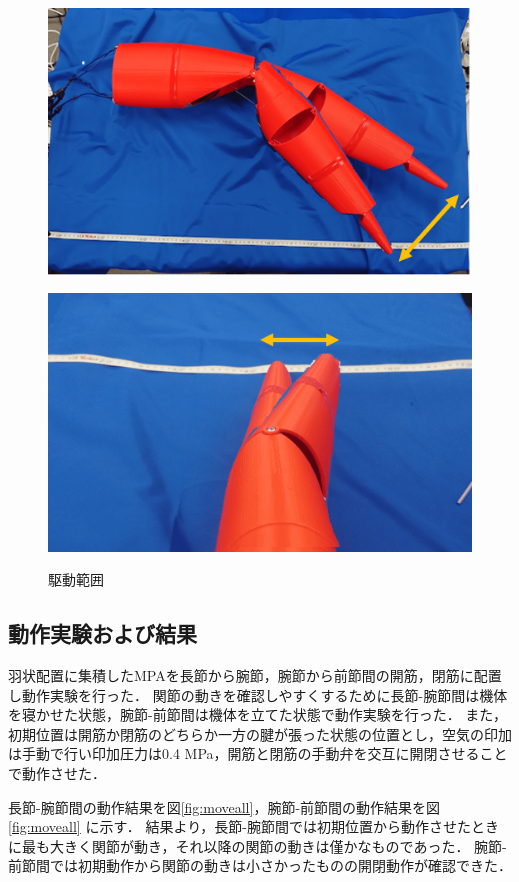 %
\begin{figure}[t]
  \begin{minipage}{0.5\hsize}
    \centering
    \includegraphics[scale=0.15]{image/kousatu2_1.png}
    \label{fig:kousatu2_1}
  \end{minipage}
  \begin{minipage}{0.5\hsize}
    \centering
    \includegraphics[scale=0.15]{image/kousatu2_2.png}
    \label{fig:kousatu2_2}
  \end{minipage}
  \caption{駆動範囲}
  \label{fig:kousatu2}
\end{figure}
\subsection{動作実験および結果}
羽状配置に集積したMPAを長節から腕節，腕節から前節間の開筋，閉筋に配置し動作実験を行った．
関節の動きを確認しやすくするために長節-腕節間は機体を寝かせた状態，腕節-前節間は機体を立てた状態で動作実験を行った．
また，初期位置は開筋か閉筋のどちらか一方の腱が張った状態の位置とし，空気の印加は手動で行い印加圧力は0.4 MPa，開筋と閉筋の手動弁を交互に開閉させることで動作させた．

長節-腕節間の動作結果を図\ref{fig:moveall}，腕節-前節間の動作結果を図\ref{fig:moveall} に示す．
結果より，長節-腕節間では初期位置から動作させたときに最も大きく関節が動き，それ以降の関節の動きは僅かなものであった．
腕節-前節間では初期動作から関節の動きは小さかったものの開閉動作が確認できた．
